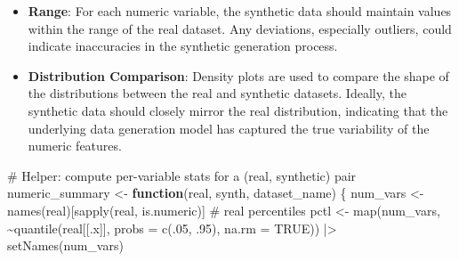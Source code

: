 \documentclass[
  letterpaper,
  DIV=11,
  numbers=noendperiod]{scrartcl}
\newenvironment{Shaded}{\begin{snugshade}}{\end{snugshade}}
\newcommand{\AttributeTok}[1]{\textcolor[rgb]{0.40,0.45,0.13}{#1}}
\newcommand{\CommentTok}[1]{\textcolor[rgb]{0.37,0.37,0.37}{#1}}
\newcommand{\ConstantTok}[1]{\textcolor[rgb]{0.56,0.35,0.01}{#1}}
\newcommand{\ControlFlowTok}[1]{\textcolor[rgb]{0.00,0.23,0.31}{\textbf{#1}}}
\newcommand{\DecValTok}[1]{\textcolor[rgb]{0.68,0.00,0.00}{#1}}
\newcommand{\FunctionTok}[1]{\textcolor[rgb]{0.28,0.35,0.67}{#1}}
\newcommand{\NormalTok}[1]{\textcolor[rgb]{0.00,0.23,0.31}{#1}}
\newcommand{\OtherTok}[1]{\textcolor[rgb]{0.00,0.23,0.31}{#1}}
\newcommand{\SpecialCharTok}[1]{\textcolor[rgb]{0.37,0.37,0.37}{#1}}
\begin{document}
\begin{itemize}
\item
  \textbf{Range}: For each numeric variable, the synthetic data should
  maintain values within the range of the real dataset. Any deviations,
  especially outliers, could indicate inaccuracies in the synthetic
  generation process.
\item
  \textbf{Distribution Comparison}: Density plots are used to compare
  the shape of the distributions between the real and synthetic
  datasets. Ideally, the synthetic data should closely mirror the real
  distribution, indicating that the underlying data generation model has
  captured the true variability of the numeric features.
\end{itemize}

\begin{Shaded}
\begin{Highlighting}[]
\CommentTok{\# Helper: compute per{-}variable stats for a (real, synthetic) pair}
\NormalTok{numeric\_summary }\OtherTok{\textless{}{-}} \ControlFlowTok{function}\NormalTok{(real, synth, dataset\_name) \{}
\NormalTok{  num\_vars }\OtherTok{\textless{}{-}} \FunctionTok{names}\NormalTok{(real)[}\FunctionTok{sapply}\NormalTok{(real, is.numeric)]}
  \CommentTok{\# real percentiles}
\NormalTok{  pctl }\OtherTok{\textless{}{-}} \FunctionTok{map}\NormalTok{(num\_vars, }\SpecialCharTok{\textasciitilde{}}\FunctionTok{quantile}\NormalTok{(real[[.x]], }\AttributeTok{probs =} \FunctionTok{c}\NormalTok{(.}\DecValTok{05}\NormalTok{, .}\DecValTok{95}\NormalTok{), }\AttributeTok{na.rm =} \ConstantTok{TRUE}\NormalTok{)) }\SpecialCharTok{|\textgreater{}}
    \FunctionTok{setNames}\NormalTok{(num\_vars)}


\end{Highlighting}
\end{Shaded}
\end{document}
